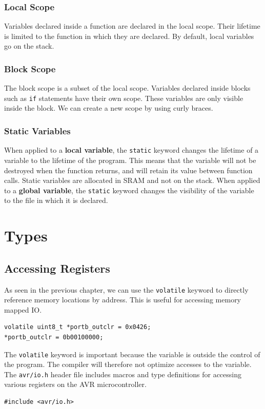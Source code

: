 \documentclass[a4paper]{report}
\begin{document}
\subsection{Local Scope}
Variables declared inside a function are declared in the local scope.
Their lifetime is limited to the function in which they are declared.
By default, local variables go on the stack.
\subsection{Block Scope}
The block scope is a subset of the local scope.
Variables declared inside blocks such as \texttt{if} statements
have their own scope. These variables are only visible inside the block.
We can create a new scope by using curly braces.
\subsection{Static Variables}
When applied to a \textbf{local variable}, the \texttt{static} keyword
changes the lifetime of a variable to the lifetime of the program.
This means that the variable will not be destroyed when the function
returns, and will retain its value between function calls.
Static variables are allocated in SRAM and not on the stack.
When applied to a \textbf{global variable}, the \texttt{static} keyword
changes the visibility of the variable to the file in which it is declared.
\chapter{Types}
\section{Accessing Registers}
As seen in the previous chapter, we can use the \texttt{volatile} keyword
to directly reference memory locations by address. This is useful for accessing
memory mapped IO\@.
\begin{verbatim}
volatile uint8_t *portb_outclr = 0x0426;
*portb_outclr = 0b00100000;
\end{verbatim}
The \texttt{volatile} keyword is important because the variable
is outside the control of the program. The compiler will therefore not optimize
accesses to the variable.
The \texttt{avr/io.h}
header file includes macros and type definitions for accessing various
registers on the AVR microcontroller.
\begin{verbatim}
#include <avr/io.h>
\end{verbatim}
\end{document}
